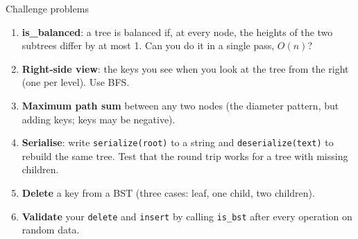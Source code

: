 \documentclass[aspectratio=169,10pt]{beamer}
\begin{document}
\begin{frame}{Challenge problems}
\begin{enumerate}\setlength\itemsep{6pt}
\item \textbf{is\_balanced}: a tree is balanced if, at every node, the heights of the two subtrees differ by at most 1. Can you do it in a single pass, $O(n)$?
\item \textbf{Right-side view}: the keys you see when you look at the tree from the right (one per level). Use BFS.
\item \textbf{Maximum path sum} between any two nodes (the diameter pattern, but adding keys; keys may be negative).
\item \textbf{Serialise}: write \texttt{serialize(root)} to a string and \texttt{deserialize(text)} to rebuild the same tree. Test that the round trip works for a tree with missing children.
\item \textbf{Delete} a key from a BST (three cases: leaf, one child, two children).
\item \textbf{Validate} your \texttt{delete} and \texttt{insert} by calling \texttt{is\_bst} after every operation on random data.
\end{enumerate}
\end{frame}
\end{document}
